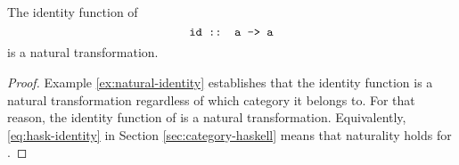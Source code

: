 
\begin{example}
  [Identity]

  \label{ex:natural-id-haskell}


  The identity function of \hask
  \begin{equation*}
    \text{\texttt{id :: a -> a}}
  \end{equation*}
  is a natural transformation.
  \begin{proof}
    Example \ref{ex:natural-identity} establishes that the identity
    function is a natural transformation regardless of which category
    it belongs to. For that reason, the identity function of \hask is
    a natural transformation. Equivalently, \eqref{eq:hask-identity}
    in Section \ref{sec:category-haskell} means that naturality holds
    for .
  \end{proof}

\end{example}

